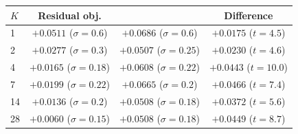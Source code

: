\begin{tabular}{lccc}
\toprule
$K$ & Residual obj. & \ourmethod{} & Difference \\
\midrule
1 & $+0.0511$ ($\sigma{=}0.6$) & $+0.0686$ ($\sigma{=}0.6$) & $+0.0175$ ($t{=}4.5$) \\
2 & $+0.0277$ ($\sigma{=}0.3$) & $+0.0507$ ($\sigma{=}0.25$) & $+0.0230$ ($t{=}4.6$) \\
4 & $+0.0165$ ($\sigma{=}0.18$) & $+0.0608$ ($\sigma{=}0.22$) & $+0.0443$ ($t{=}10.0$) \\
7 & $+0.0199$ ($\sigma{=}0.22$) & $+0.0665$ ($\sigma{=}0.2$) & $\mathbf{+0.0466}$ ($t{=}7.4$) \\
14 & $+0.0136$ ($\sigma{=}0.2$) & $+0.0508$ ($\sigma{=}0.18$) & $+0.0372$ ($t{=}5.6$) \\
28 & $+0.0060$ ($\sigma{=}0.15$) & $+0.0508$ ($\sigma{=}0.18$) & $+0.0449$ ($t{=}8.7$) \\
\bottomrule
\end{tabular}
